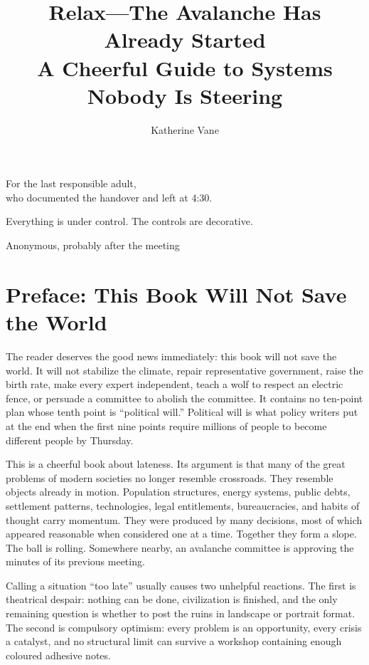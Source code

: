 \documentclass[12pt,a4paper]{book}
\title{Relax---The Avalanche Has Already Started\\[0.6em]
\large A Cheerful Guide to Systems Nobody Is Steering}
\author{Katherine Vane}
\date{}
\begin{document}
\frontmatter
\maketitle

\thispagestyle{empty}
\vspace*{\fill}
\begin{center}
For the last responsible adult,\\
who documented the handover and left at 4:30.
\end{center}
\vspace*{\fill}
\clearpage

\epigraph{Everything is under control. The controls are decorative.}{Anonymous, probably after the meeting}

\tableofcontents

\chapter*{Preface: This Book Will Not Save the World}

The reader deserves the good news immediately: this book will not save the
world.  It will not stabilize the climate, repair representative government,
raise the birth rate, make every expert independent, teach a wolf to respect an
electric fence, or persuade a committee to abolish the committee.  It contains
no ten-point plan whose tenth point is ``political will.''  Political will is
what policy writers put at the end when the first nine points require millions
of people to become different people by Thursday.

This is a cheerful book about lateness.  Its argument is that many of the great
problems of modern societies no longer resemble crossroads.  They resemble
objects already in motion.  Population structures, energy systems, public
debts, settlement patterns, technologies, legal entitlements, bureaucracies,
and habits of thought carry momentum.  They were produced by many decisions,
most of which appeared reasonable when considered one at a time.  Together
they form a slope.  The ball is rolling.  Somewhere nearby, an avalanche
committee is approving the minutes of its previous meeting.

Calling a situation ``too late'' usually causes two unhelpful reactions.  The
first is theatrical despair: nothing can be done, civilization is finished,
and the only remaining question is whether to post the ruins in landscape or
portrait format.  The second is compulsory optimism: every problem is an
opportunity, every crisis a catalyst, and no structural limit can survive a
workshop containing enough coloured adhesive notes.
\end{document}
